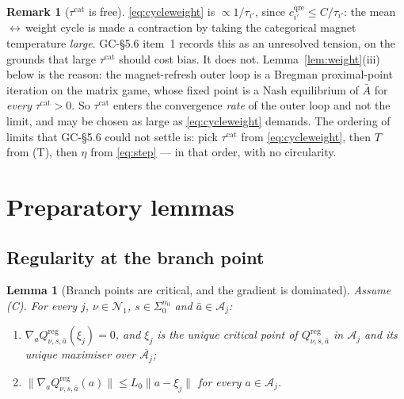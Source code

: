 \documentclass[11pt]{article}
\newtheorem{lemma}{Lemma}
\theoremstyle{definition}
\newtheorem{remark}{Remark}
\newcommand{\cA}{\mathcal{A}}
\newcommand{\cN}{\mathcal{N}}
\newcommand{\GC}[1]{\textsf{GC-#1}}
\begin{document}
\begin{remark}[$\tau^{\mathrm{cat}}$ is free]\label{rem:tau}
\eqref{eq:cycleweight} is $\propto 1/\tau_{i'}$, since
$c^{\mathrm{qre}}_{i'} \le C/\tau_{i'}$: the mean\,$\leftrightarrow$\,weight cycle
is made a contraction by taking the categorical magnet temperature
\emph{large}. \GC{\S5.6} item~1 records this as an unresolved tension, on the
grounds that large $\tau^{\mathrm{cat}}$ should cost bias. It does not.
Lemma~\ref{lem:weight}(iii) below is the reason: the magnet-refresh outer loop is
a Bregman proximal-point iteration on the matrix game, whose fixed point is a
Nash equilibrium of $\bar A$ for \emph{every} $\tau^{\mathrm{cat}} > 0$. So
$\tau^{\mathrm{cat}}$ enters the convergence \emph{rate} of the outer loop and
not the limit, and may be chosen as large as \eqref{eq:cycleweight} demands. The
ordering of limits that \GC{\S5.6} could not settle is: pick $\tau^{\mathrm{cat}}$
from \eqref{eq:cycleweight}, then $T$ from (T), then $\eta$ from
\eqref{eq:step} --- in that order, with no circularity.
\end{remark}

\section{Preparatory lemmas}\label{sec:lemmas}

\subsection{Regularity at the branch point}

\begin{lemma}[Branch points are critical, and the gradient is dominated]
\label{lem:dom}
Assume (C). For every $j$, $\nu \in \cN_1$, $s \in \Sigma_0^{n_0}$ and
$\bar a \in \cA_j$:
\begin{enumerate}
\item[(i)] $\nabla_a Q^{\mathrm{reg}}_{\nu,s,\bar a}(\xi_j) = 0$, and $\xi_j$ is
  the unique critical point of $Q^{\mathrm{reg}}_{\nu,s,\bar a}$ in $\cA_j$ and
  its unique maximiser over $\overline{\cA_j}$;
\item[(ii)] $\big\|\nabla_a Q^{\mathrm{reg}}_{\nu,s,\bar a}(a)\big\|
  \le L_0 \|a - \xi_j\|$ for every $a \in \cA_j$.
\end{enumerate}
\end{lemma}
\end{document}
